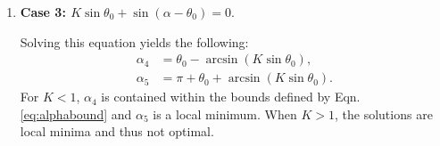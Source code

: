 \documentclass[12pt]{article}
\begin{document}
\begin{enumerate}

\item[]{\bf Case 3: $K\sin \theta_0 + \sin(\alpha -\theta_0) = 0.$}

Solving this equation yields the following:
%
\begin{align*}
\alpha_4 & = \theta_0 - \arcsin(K \sin \theta_0), \\
\alpha_5 & = \pi + \theta_0 + \arcsin(K \sin \theta_0).
\end{align*}
%
For $K<1$, $\alpha_4$ is contained within the bounds defined by Eqn. \ref{eq:alphabound} and $\alpha_5$ is a local minimum. 
When $K>1$, the solutions are local minima and thus not optimal.     
\end{enumerate}
 
\end{document}
